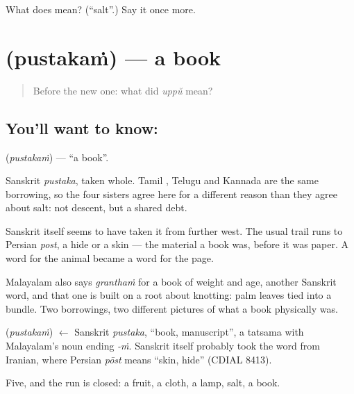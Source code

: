 \begin{tcolorbox}[breakable,colback=teal!4,colframe=teal!35!black,title={Before you move on}]
What does  mean? (\textquotedblleft{}salt\textquotedblright{}.) Say it once more.
\end{tcolorbox}
\section[\texorpdfstring{\ml{പുസ്തകം} (pustakaṁ)}{പുസ്തകം (pustakaṁ)}]{ (pustakaṁ) — a book}

\label{lesson:ML-C46-book}



\begin{quote}
Before the new one: what did \emph{uppŭ} mean?
\end{quote}

\subsection*{You'll want to know: }
\textbf{} (\emph{pustakaṁ}) — \textquotedblleft{}a book\textquotedblright{}.

Sanskrit \emph{pustaka}, taken whole. Tamil , Telugu  and Kannada  are the same borrowing, so the four sisters agree here for a different reason than they agree about salt: not descent, but a shared debt.

Sanskrit itself seems to have taken it from further west. The usual trail runs to Persian \emph{post}, a hide or a skin — the material a book was, before it was paper. A word for the animal became a word for the page.

Malayalam also says \emph{granthaṁ} for a book of weight and age, another Sanskrit word, and that one is built on a root about knotting: palm leaves tied into a bundle. Two borrowings, two different pictures of what a book physically was.

\begin{cousinweb}
\textbf{} (\emph{pustakaṁ}) $\leftarrow$ Sanskrit \emph{pustaka}, \textquotedblleft{}book, manuscript\textquotedblright{}, a tatsama with Malayalam's noun ending \emph{-ṁ}. Sanskrit itself probably took the word from Iranian, where Persian \emph{pōst} means \textquotedblleft{}skin, hide\textquotedblright{} (CDIAL 8413).
\end{cousinweb}

\begin{grammarlens}[title={What you've built}]
Five, and the run is closed: a fruit, a cloth, a lamp, salt, a book.
\end{grammarlens}

